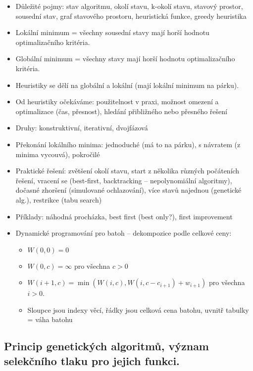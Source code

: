 \documentclass[a4paper,hidelinks]{article}
\begin{document}
\begin{itemize}
    \item Důležité pojmy: stav algoritmu, okolí stavu, k-okolí stavu, stavový prostor, sousední stav, graf stavového prostoru, heuristická funkce, greedy heuristika
    \item Lokální minimum = všechny sousední stavy mají horší hodnotu optimalizačního kritéria.
    \item Globální minimum = všechny stavy mají horší hodnotu optimalizačního kritéria.
    \item Heuristiky se dělí na globální a lokální (mají lokální minimum na párku).
    \item Od heuristiky očekáváme: použitelnost v praxi, možnost omezení a optimalizace (čas, přesnost), hledání přibližného nebo přesného řešení
    \item Druhy: konstruktivní, iterativní, dvojfázová
    \item Překonání lokálního minima: jednoduché (má to na párku), s návratem (z minima vycouvá), pokročilé
    \item Praktické řešení: zvětšení okolí stavu, start z několika různých počáteních řešení, vracení se (best-first, backtracking -- nepolynomiální algoritmy), dočasné zhoršení (simulované ochlazování), více stavů najednou (genetické alg.), restrikce (tabu search)
    \item Příklady: náhodná procházka, best first (best only?), first improvement
    \item Dynamické programování pro batoh -- dekompozice podle celkové ceny:
    \begin{itemize}
        \item $W(0,0) = 0$
        \item $W(0,c) = \infty$ pro všechna $c > 0$
        \item $W(i+1, c) = \min(W(i, c), W(i, c-c_{i+1})+w_{i+1})$ pro všechna $i > 0$.
        \item Sloupce jsou indexy věcí, řádky jsou celková cena batohu, uvnitř tabulky = váha batohu
    \end{itemize}
\end{itemize}

\subsection{Princip genetických algoritmů, význam selekčního tlaku pro jejich funkci.}
\end{document}
